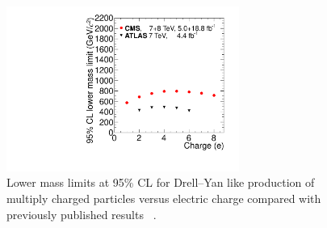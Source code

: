 \begin{figure}
 \begin{center}
 \includegraphics[clip=false, trim=0.0cm 0cm 0.0cm 0cm, width=0.68\textwidth]{figures/DYhscp_resultsNov2012}
 \end{center}
 \caption[Lower mass limits on HSCP produced with various charge compared with previously published results]
{Lower mass limits at 95\% CL for Drell--Yan like production of multiply charged particles versus electric charge compared with previously published results
~\cite{ATLASmCHAMPs}.
}
   \label{fig:HQmasslimits}
\end{figure}